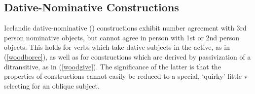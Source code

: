 \documentclass[output=paper,colorlinks,citecolor=brown,
]{langscibook}
\begin{document}
%






%






\subsection{Dative-Nominative Constructions} \label{wooddativ}

Icelandic dative-nominative (\datnomn) constructions exhibit number agreement with 3rd person nominative objects, but cannot agree in person with 1st or 2nd person objects. This holds for verbs which  take dative subjects in the active, as in (\ref{woodboree}), as well as for \datnom constructions which are derived by passivization of a ditransitive, as in (\ref{woodgive}). The significance of the latter is that the properties of \datnom constructions cannot easily be reduced to a special, `quirky' little v selecting for an oblique subject.
\end{document}
